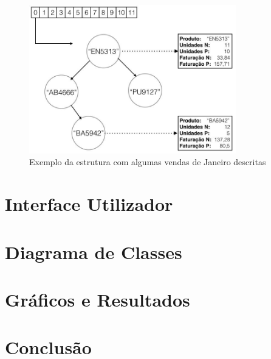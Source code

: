 \documentclass[10pt] {article}
\begin{document}
\begin{figure}[ht!]
\centering
\includegraphics[width=90mm]{accounting.jpg}
\caption{Exemplo da estrutura com algumas vendas de Janeiro descritas}
\label{fig:sales}
\end{figure}

\newpage
\section{Interface Utilizador}

\newpage
\section{Diagrama de Classes}

\newpage
\section{Gráficos e Resultados}

\newpage
\section{Conclusão}
\end{document}
